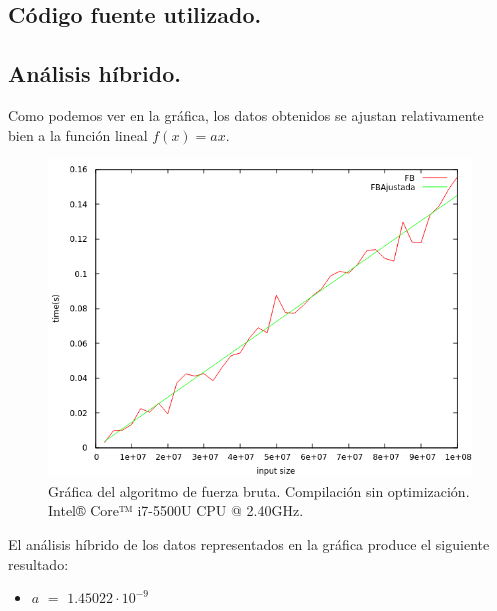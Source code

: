 \documentclass[11pt,a4paper]{article}
\begin{document}
		\subsection{Código fuente utilizado.}


\newpage

		\subsection{Análisis híbrido.}

			\par
			Como podemos ver en la gráfica, los datos obtenidos se ajustan relativamente bien a la función lineal $f(x) = ax$. 

			\begin{figure}[h]

				\centering
				\includegraphics[width=1\textwidth]{FBAjustada.png}
				\caption{Gráfica del algoritmo de fuerza bruta. Compilación sin optimización. Intel® Core™ i7-5500U CPU @ 2.40GHz.}

			\end{figure}

			\par
			El análisis híbrido de los datos representados en la gráfica produce el siguiente resultado:

			\begin{itemize}

				\item
				$a$ $=$ $1.45022\cdot 10^{-9}$

			\end{itemize}
\end{document}
